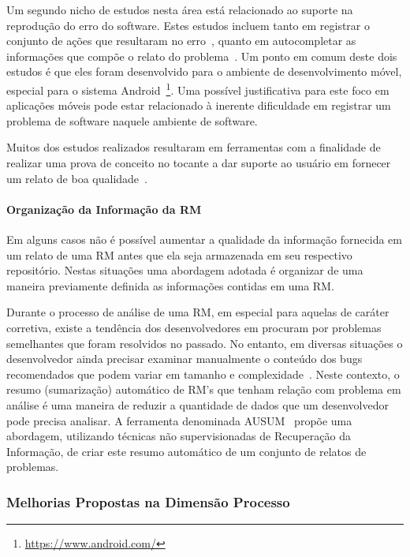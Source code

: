 Um segundo nicho de estudos  nesta área está relacionado ao suporte na
reprodução do erro do software. Estes estudos incluem tanto em registrar o
conjunto de ações que resultaram no erro~\cite{White:2015:GRR:2820282.2820291},
quanto em autocompletar as informações que compõe o relato do
problema~\cite{moran2015auto}. Um ponto em comum deste dois estudos é que eles
foram desenvolvido para o ambiente de desenvolvimento móvel, especial para o
sistema Android~\footnote{\url{https://www.android.com/}}. Uma possível
justificativa para este foco em aplicações móveis pode estar relacionado à
inerente dificuldade em registrar um problema de software naquele ambiente de
software. 

Muitos dos estudos realizados resultaram em ferramentas com a finalidade de
realizar uma prova de conceito no tocante a dar suporte ao usuário em fornecer
um relato de boa qualidade~\cite{Tu:2014:MQI:2677832.2677844, Bettenburg2008a,
	Wu2011a,White:2015:GRR:2820282.2820291,moran2015auto}. 

\paragraph{Organização da Informação da RM}

Em alguns casos não é possível aumentar a qualidade da informação fornecida
em um relato de uma RM antes que ela seja armazenada em seu respectivo
repositório.  Nestas situações uma abordagem adotada é organizar de uma
maneira previamente definida as informações contidas em uma RM\@.

Durante o processo de análise de uma RM, em especial para aquelas de caráter
corretiva, existe a tendência dos desenvolvedores em procuram por problemas
semelhantes que foram resolvidos no passado. No entanto, em diversas situações o
desenvolvedor ainda precisar examinar manualmente o conteúdo dos bugs
recomendados que podem variar em tamanho e complexidade~\cite{mani2012ausum}.
Neste contexto, o resumo (sumarização) automático de RM's que tenham relação com
problema em análise é uma maneira de reduzir a quantidade de dados que um
desenvolvedor pode precisa analisar. A ferramenta denominada
AUSUM~\cite{mani2012ausum} propõe uma abordagem, utilizando técnicas não
supervisionadas de Recuperação da Informação, de criar este resumo automático de
um conjunto de relatos de problemas.

\subsubsection{Melhorias Propostas na Dimensão Processo}
\label{ssub:melhorias_dim_processo}

